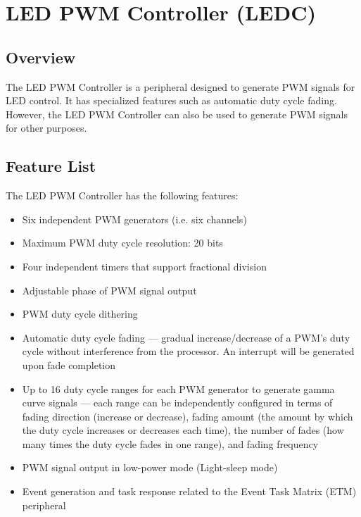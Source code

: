 \documentclass[main\_\_EN.tex]{subfiles}
\begin{document}

\ifglobal
\else
    \listoftodos
    {\let\clearpage\relax \listofdonetodos}
    \tableofcontents
\fi










\hypertarget{ledpwm}{}
\chapter{LED PWM Controller (LEDC)}
\label{mod:ledpwm}

\section{Overview}

The LED PWM Controller is a peripheral designed to generate PWM signals for LED control. It has specialized features such as automatic duty cycle fading. However, the LED PWM Controller can also be used to generate PWM signals for other purposes.

\section{Feature List}
The LED PWM Controller has the following features:

\begin{itemize}
    \item Six independent PWM generators (i.e. six channels)
    \item Maximum PWM duty cycle resolution: 20 bits
    \item Four independent timers that support fractional division
    \item Adjustable phase of PWM signal output
    \item PWM duty cycle dithering
    \item Automatic duty cycle fading — gradual increase/decrease of a PWM’s duty cycle without interference from the processor. An interrupt will be generated upon fade completion
    \item Up to 16 duty cycle ranges for each PWM generator to generate gamma curve signals — each range can be independently configured in terms of fading direction (increase or decrease), fading amount (the amount by which the duty cycle increases or decreases each time), the number of fades (how many times the duty cycle fades in one range), and fading frequency
    \item PWM signal output in low-power mode (Light-sleep mode)
    \item Event generation and task response related to the Event Task Matrix (ETM) peripheral
\end{itemize}
\end{document}
